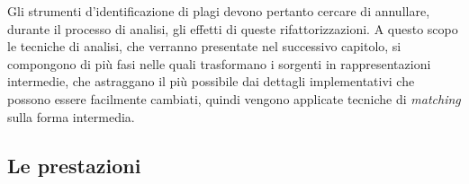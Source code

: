 Gli strumenti d'identificazione di plagi devono pertanto cercare di annullare, durante il processo di analisi, gli effetti di queste rifattorizzazioni.
%
A questo scopo le tecniche di analisi, che verranno presentate nel successivo capitolo, si compongono di più fasi nelle quali trasformano i sorgenti in rappresentazioni intermedie, che astraggano il più possibile dai dettagli implementativi che possono essere facilmente cambiati, quindi vengono applicate tecniche di \textit{matching} sulla forma intermedia.

\subsection{Le prestazioni}
